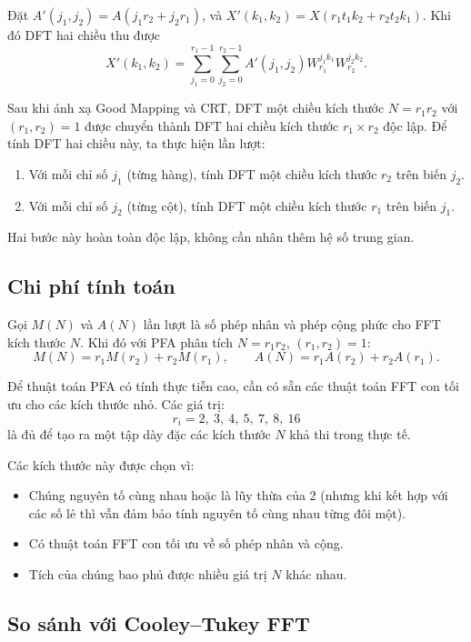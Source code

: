 Đặt $A'(j_1,j_2) = A(j_1 r_2 + j_2 r_1)$, và $X'(k_1,k_2) = X(r_1 t_1 k_2 + r_2 t_2 k_1)$. Khi đó DFT hai chiều thu được
\begin{equation}
X'(k_1,k_2) = \sum_{j_1=0}^{r_1-1} \sum_{j_2=0}^{r_2-1} A'(j_1,j_2) W_{r_1}^{j_1 k_1} W_{r_2}^{j_2 k_2}.
\end{equation}

Sau khi ánh xạ Good Mapping và CRT, DFT một chiều kích thước \(N = r_1 r_2\) với \((r_1, r_2)=1\) được chuyển thành DFT hai chiều kích thước \(r_1 \times r_2\) độc lập. Để tính DFT hai chiều này, ta thực hiện lần lượt:
\begin{enumerate}
    \item Với mỗi chỉ số \(j_1\) (từng hàng), tính DFT một chiều kích thước \(r_2\) trên biến \(j_2\).
    \item Với mỗi chỉ số \(j_2\) (từng cột), tính DFT một chiều kích thước \(r_1\) trên biến \(j_1\).
\end{enumerate}

Hai bước này hoàn toàn độc lập, không cần nhân thêm hệ số trung gian.

\subsection{Chi phí tính toán}

Gọi \(M(N)\) và \(A(N)\) lần lượt là số phép nhân và phép cộng phức cho FFT kích thước \(N\). Khi đó với PFA phân tích \(N = r_1 r_2\), \((r_1, r_2) = 1\):
\[
M(N) = r_1 M(r_2) + r_2 M(r_1), \qquad
A(N) = r_1 A(r_2) + r_2 A(r_1).
\]

Để thuật toán PFA có tính thực tiễn cao, cần có sẵn các thuật toán FFT con tối ưu cho các kích thước nhỏ. Các giá trị:
\[
r_i = 2,\ 3,\ 4,\ 5,\ 7,\ 8,\ 16
\]
là đủ để tạo ra một tập dày đặc các kích thước \(N\) khả thi trong thực tế.

Các kích thước này được chọn vì:
\begin{itemize}
    \item Chúng nguyên tố cùng nhau hoặc là lũy thừa của 2 (nhưng khi kết hợp với các số lẻ thì vẫn đảm bảo tính nguyên tố cùng nhau từng đôi một).
    \item Có thuật toán FFT con tối ưu về số phép nhân và cộng.
    \item Tích của chúng bao phủ được nhiều giá trị \(N\) khác nhau.
\end{itemize}

\subsection{So sánh với Cooley--Tukey FFT}

